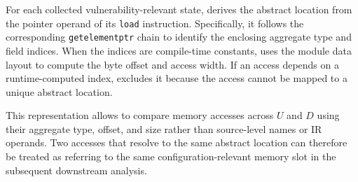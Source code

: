 
\begin{center}
    \setlength{\fboxsep}{0.4em}
    \noindent{}
\end{center}

For each collected vulnerability-relevant state, \sys derives the abstract location from the pointer operand of its \texttt{load} instruction. Specifically, it follows the corresponding \texttt{getelementptr} chain to identify the enclosing aggregate type and field indices. When the indices are compile-time constants, \sys uses the module data layout to compute the byte offset and access width. If an access depends on a runtime-computed index, \sys excludes it because the access cannot be mapped to a unique abstract location.

This representation allows \sys to compare memory accesses across $U$ and $D$ using their aggregate type, offset, and size rather than source-level names or IR operands. Two accesses that resolve to the same abstract location can therefore be treated as referring to the same configuration-relevant memory slot in the subsequent downstream analysis.



\newlength{\commentWidth}
	\setlength{\commentWidth}{7cm}
	\newcommand{\atcp}[1]{\tcp*[r]{\makebox[\commentWidth]{#1\hfill}}}
	
